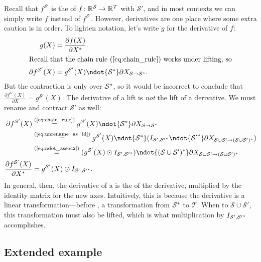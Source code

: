 Recall that $f^\mathcal{S'}$ is the \liftNN{} of $f \colon \mathbb{R}^\mathcal{S} \rightarrow \mathbb{R}^\mathcal{T}$ with $\mathcal{S'}$, and in most contexts we can simply write $f$ instead of $f^\mathcal{S'}$. However, derivatives are one place where some extra caution is in order.
To lighten notation, let's write $g$ for the derivative of $f$:
\begin{align*}
  g(X) &= \ddx{f(X)}. \\
\intertext{Recall that the chain rule (\ref{eq:chain_rule}) works under lifting, so}
  \partial f^{\mathcal{S'}} (X) &= g^{\mathcal{S'}}(X) \ndot{\mathcal{S}\inax} \partial X_{\mathcal{S}\rightarrow\mathcal{S}\inax}.
\end{align*}
But the contraction is only over $\mathcal{S}^*$, so it would be incorrect to conclude that $\frac{\partial f^{\mathcal{S'}}(X)}{\partial X} = g^{\mathcal{S'}}(X)$. The derivative of a lift is \emph{not} the lift of a derivative. We must rename and contract $\mathcal{S'}$ as well:
\begin{align*}
  \partial f^{\mathcal{S'}} (X)
  &\eqby{eq:chain_rule} g^{\mathcal{S'}}(X) \ndot{\mathcal{S}\inax} \partial X_{\mathcal{S}\rightarrow\mathcal{S}\inax} \\
  &\eqby{eq:unrename_as_id} g^{\mathcal{S'}}(X) \ndot{\mathcal{S}\inax} (I_{\mathcal{S'},\mathcal{S'}\inax} \ndot{\mathcal{S'}\inax} \partial X_{\mathcal{S}\cup\mathcal{S'}\rightarrow(\mathcal{S}\cup\mathcal{S'})\inax}) \\
  &\eqby{eq:ndot_assoc2} (g^{\mathcal{S'}}(X) \odot I_{\mathcal{S'},\mathcal{S'}\inax}) \ndot{(\mathcal{S}\cup\mathcal{S'})\inax} \partial X_{\mathcal{S}\cup\mathcal{S'}\rightarrow(\mathcal{S}\cup\mathcal{S'})\inax} \\
  \frac{\partial f^{\mathcal{S'}} (X)}{\partial X\inax}
  &= g^{\mathcal{S'}}(X) \odot I_{\mathcal{S'}, \mathcal{S'}\inax}.
\end{align*}
In general, then, the derivative of a \liftNN{} is the \liftNN{} of the derivative, multiplied by the identity matrix for the new axes.
Intuitively, this is because the derivative is a linear transformation---before \liftingNN{}, a transformation from $\mathcal{S}^*$ to $\mathcal{T}$. When \liftingVBG{} to $\mathcal{S} \cup \mathcal{S}'$, this transformation must also be lifted, which is what multiplication by $I_{\mathcal{S}',\mathcal{S'}^*}$ accomplishes.

\subsection{Extended example}

